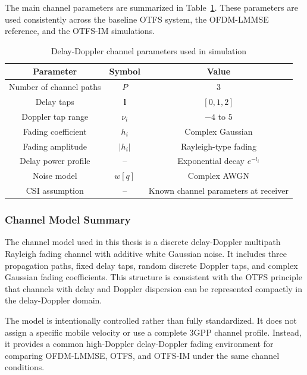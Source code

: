 The main channel parameters are summarized in Table~\ref{tab:channel_model_parameters}. These parameters are used consistently across the baseline OTFS system, the OFDM-LMMSE reference, and the OTFS-IM simulations.

\begin{table}[H]
    \centering
    \caption{Delay-Doppler channel parameters used in simulation}
    \label{tab:channel_model_parameters}
    \begin{tabular}{c c c}
        \hline
        Parameter & Symbol & Value \\
        \hline
        Number of channel paths & \(P\) & 3 \\
        Delay taps & \(\mathbf{l}\) & \([0,1,2]\) \\
        Doppler tap range & \(\nu_i\) & \(-4\) to \(5\) \\
        Fading coefficient & \(h_i\) & Complex Gaussian \\
        Fading amplitude & \(|h_i|\) & Rayleigh-type fading \\
        Delay power profile & -- & Exponential decay \(e^{-l_i}\) \\
        Noise model & \(w[q]\) & Complex AWGN \\
        CSI assumption & -- & Known channel parameters at receiver \\
        \hline
    \end{tabular}
\end{table}

\subsubsection{Channel Model Summary}

The channel model used in this thesis is a discrete delay-Doppler multipath Rayleigh fading channel with additive white Gaussian noise. It includes three propagation paths, fixed delay taps, random discrete Doppler taps, and complex Gaussian fading coefficients. This structure is consistent with the OTFS principle that channels with delay and Doppler dispersion can be represented compactly in the delay-Doppler domain.

The model is intentionally controlled rather than fully standardized. It does not assign a specific mobile velocity or use a complete 3GPP channel profile. Instead, it provides a common high-Doppler delay-Doppler fading environment for comparing OFDM-LMMSE, OTFS, and OTFS-IM under the same channel conditions.
